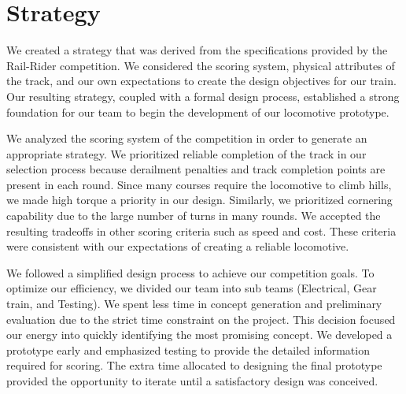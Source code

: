 \documentclass[class=../report, crop=false]{standalone}
\begin{document}
\section{Strategy}

We created a strategy that was derived from the specifications provided by the Rail-Rider competition.
We considered the scoring system, physical attributes of the track, and our own expectations to create the design objectives for our train.
Our resulting strategy, coupled with a formal design process, established a strong foundation for our team to begin the development of our locomotive prototype.

We analyzed the scoring system of the competition in order to generate an appropriate strategy.
We prioritized reliable completion of the track in our selection process because derailment penalties and track completion points are present in each round.
Since many courses require the locomotive to climb hills, we made high torque a priority in our design.
Similarly, we prioritized cornering capability due to the large number of turns in many rounds.
We accepted the resulting tradeoffs in other scoring criteria such as speed and cost.
These criteria were consistent with our expectations of creating a reliable locomotive.

We followed a simplified design process to achieve our competition goals.
To optimize our efficiency, we divided our team into sub teams (Electrical, Gear train, and Testing).
We spent less time in concept generation and preliminary evaluation due to the strict time constraint on the project.
This decision focused our energy into quickly identifying the most promising concept.
We developed a prototype early and emphasized testing to provide the detailed information required for scoring.
The extra time allocated to designing the final prototype provided the opportunity to iterate until a satisfactory design was conceived.
\end{document}
